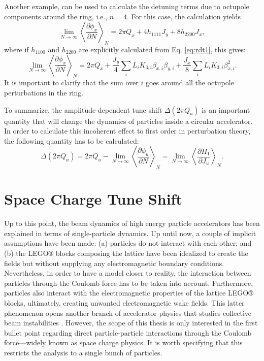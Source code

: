 Another example, can be used to calculate the detuning terms due to octupole components around the ring, i.e., $n=4$. For this case, the calculation yields
\begin{equation}
    \label{eq:octu}
    \lim_{N\to\infty} \left\langle \frac{\partial \phi_x}{\partial N}\right\rangle _N = 2\pi Q_x + 4h_{1111}J_y + 8 h_{2200} J_x,
\end{equation}
where if $h_{1100}$ and $h_{2200}$ are explicitly calculated from Eq. \ref{eq:rdt1}, this gives:
\begin{equation}
    \label{eq:octu2}
    \lim_{N\to\infty} \left\langle \frac{\partial \phi_x}{\partial N}\right\rangle _N = 2\pi Q_x + \frac{J_y}{4}\sum_i L_i K_{3,i} \beta_{x,i} \beta_{y,i} + \frac{J_x}{8}\sum_i L_i K_{3,i} \beta_{x,i}^2.
\end{equation}
It is important to clarify that the sum over $i$ goes around all the octupole perturbations in the ring.

To summarize, the amplitude-dependent tune shift $\Delta\left( 2 \pi Q_u \right)$ is an important quantity that will change the dynamics of particles inside a circular accelerator. In order to calculate this incoherent effect to first order in perturbation theory, the following quantity has to be calculated:
\begin{equation}
    \label{eq:adtsfinal}
    \Delta\left( 2 \pi Q_u \right) = 2\pi Q_u - \lim_{N\to\infty} \left\langle \frac{\partial \phi_u}{\partial N}\right\rangle _N = \lim_{N\to\infty} \left\langle \frac{\partial H_1}{\partial J_u} \right\rangle _N. 
\end{equation}  

\section{\label{sec:sc1}Space Charge Tune Shift}

Up to this point, the beam dynamics of high energy particle accelerators has been explained in terms of single-particle dynamics. Up until now, a couple of implicit assumptions have been made: (a) particles do not interact with each other; and (b) the LEGO® blocks composing the lattice have been idealized to create the fields but without supplying any electromagnetic boundary conditions. Nevertheless, in order to have a model closer to reality, the interaction between particles through the Coulomb force has to be taken into account. Furthermore, particles also interact with the electromagnetic properties of the lattice LEGO® blocks, ultimately, creating unwanted electromagnetic wake fields. This latter phenomenon opens another branch of accelerator physics that studies collective beam instabilities \cite{chao}. However, the scope of this thesis is only interested in the first bullet point regarding direct particle-particle interactions through the Coulomb force---widely known as space charge physics. It is worth specifying that this restricts the analysis to a single bunch of particles. 

